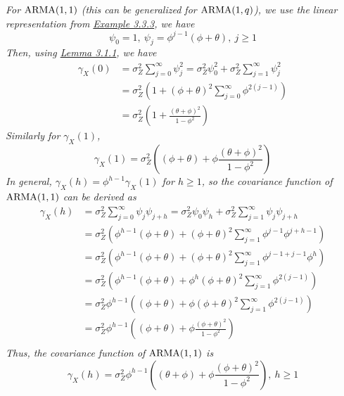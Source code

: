 \begin{example}[ARMA(1,1)]
    \emph{
        For $\operatorname{ARMA}(1,1)$ (this can be generalized for $\operatorname{ARMA}(1,q)$), we use the linear representation from \hyperref[ex:linear_arma11]{Example 3.3.3}, we have 
        \[\psi_0 = 1, \ \psi_j = \phi^{j-1}(\phi + \theta), \ j \geq 1\]
        Then, using \hyperref[lemma:linear_acf]{Lemma 3.1.1}, we have
        \begin{align*}
            \gamma_X(0) &= \sigma_Z^2\sum_{j=0}^\infty \psi_j^2 =\sigma_Z^2\psi_0^2 + \sigma_Z^2 \sum_{j=1}^\infty \psi_j^2\\
            &= \sigma_Z^2 \left(1 + (\phi + \theta)^2 \sum_{j=0}^\infty \phi^{2(j-1)}\right)\\
            &= \sigma_Z^2 \left(1 + \frac{(\theta + \phi)^2}{1-\phi^2}\right)
        \end{align*}
        Similarly for $\gamma_X(1)$, 
        \[\gamma_X(1) = \sigma_Z^2 \left((\phi + \theta) + \phi \frac{(\theta + \phi)^2}{1-\phi^2}\right)\]
        In general, $\gamma_X(h) = \phi^{h-1}\gamma_X(1)$ for $h \geq 1$, so the covariance function of $\operatorname{ARMA}(1,1)$ can be derived as
        \begin{align*}
            \gamma_X(h) &= \sigma_Z^2\sum_{j=0}^\infty \psi_j\psi_{j+h} = \sigma_Z^2\psi_0\psi_h + \sigma_Z^2 \sum_{j=1}^\infty \psi_j\psi_{j+h}\\
            &= \sigma_Z^2\left(\phi^{h-1}(\phi + \theta) + (\phi + \theta)^2\sum_{j=1}^\infty\phi^{j-1}\phi^{j+h-1}\right)\\
            &=\sigma_Z^2\left(\phi^{h-1}(\phi + \theta) + (\phi + \theta)^2\sum_{j=1}^\infty\phi^{j-1 + j - 1}\phi^{h}\right)\\
            &=\sigma_Z^2\left(\phi^{h-1}(\phi + \theta) + \phi^h(\phi + \theta)^2\sum_{j=1}^\infty\phi^{2(j-1)}\right)\\
            &=\sigma_Z^2\phi^{h-1}\left((\phi + \theta) + \phi(\phi + \theta)^2\sum_{j=1}^\infty\phi^{2(j-1)}\right)\\
            &= \sigma_Z^2\phi^{h-1}\left((\phi + \theta) + \phi\frac{(\phi + \theta)^2}{1-\phi^2}\right)\\
        \end{align*}
        Thus, the covariance function of $\operatorname{ARMA}(1,1)$ is
        \[\gamma_X(h) = \sigma_Z^2\phi^{h-1}\left((\theta+\phi) + \phi \frac{(\phi + \theta)^2}{1-\phi^2}\right), \ h \geq 1\]
    }
\end{example}

